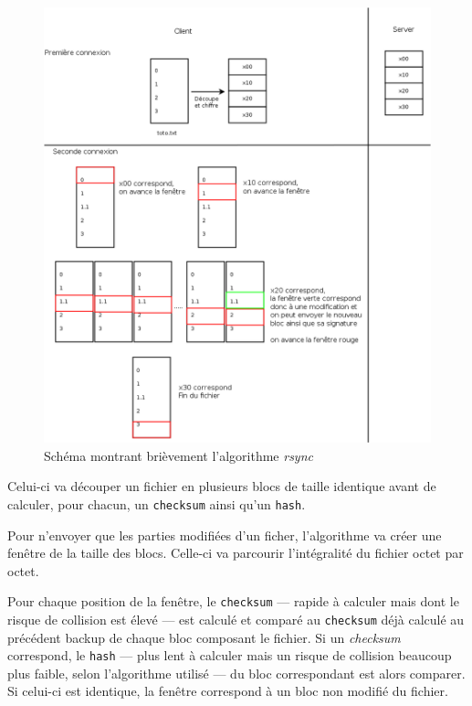 \documentclass[a4paper,10pt, twoside]{report}
\begin{document}
\begin{spacing}{1.2}
\begin{figure}[h!]
    \centering
    \includegraphics[width=15cm]{algo/rsyncalgo.png}
    \caption{\label{rsyncAlgo} Sch\'ema montrant bri\`evement
    l'algorithme \textit{rsync}}
\end{figure}

Celui-ci va d\'ecouper un fichier en plusieurs blocs de taille identique avant
de calculer, pour chacun, un \texttt{checksum} ainsi qu'un \texttt{hash}.

Pour n'envoyer que les parties modifi\'ees d'un ficher, l'algorithme va cr\'eer
une fen\^etre de la taille des blocs. Celle-ci va parcourir l'int\'egralit\'e
du fichier octet par octet.

Pour chaque position de la fen\^etre, le \texttt{checksum} --- rapide \`a
calculer mais dont le risque de collision est \'elev\'e --- est calcul\'e et
compar\'e au \texttt{checksum} d\'ej\`a calcul\'e au pr\'ec\'edent backup de
chaque bloc composant le fichier. Si un \textit{checksum} correspond, le
\texttt{hash} --- plus lent \`a calculer mais un risque de collision beaucoup
plus faible, selon l'algorithme utilis\'e --- du bloc correspondant est alors
comparer. Si celui-ci est identique, la fen\^etre correspond \`a un bloc non
modifi\'e du fichier.


\end{spacing}
\end{document}
